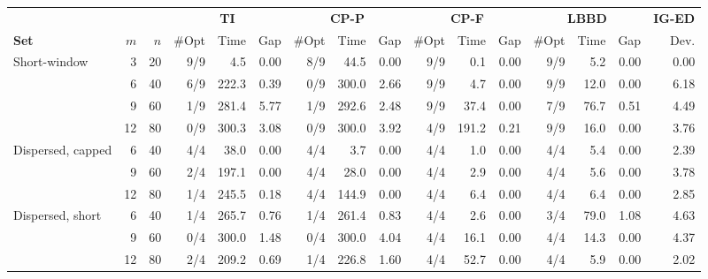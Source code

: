 \begin{tabular*}{\textwidth}{@{\extracolsep\fill}lrr rrr rrr rrr rrr r@{\extracolsep\fill}}
\toprule
& & & \multicolumn{3}{c}{\textbf{TI}} & \multicolumn{3}{c}{\textbf{CP-P}} & \multicolumn{3}{c}{\textbf{CP-F}} & \multicolumn{3}{c}{\textbf{LBBD}} & \textbf{IG-ED} \\
\cmidrule{4-6}\cmidrule{7-9}\cmidrule{10-12}\cmidrule{13-15}
\textbf{Set} & $m$ & $n$ & \#Opt & Time & Gap & \#Opt & Time & Gap & \#Opt & Time & Gap & \#Opt & Time & Gap & Dev. \\
\midrule
Short-window & 3 & 20 & 9/9 & 4.5 & 0.00 & 8/9 & 44.5 & 0.00 & 9/9 & 0.1 & 0.00 & 9/9 & 5.2 & 0.00 & 0.00 \\
 & 6 & 40 & 6/9 & 222.3 & 0.39 & 0/9 & 300.0 & 2.66 & 9/9 & 4.7 & 0.00 & 9/9 & 12.0 & 0.00 & 6.18 \\
 & 9 & 60 & 1/9 & 281.4 & 5.77 & 1/9 & 292.6 & 2.48 & 9/9 & 37.4 & 0.00 & 7/9 & 76.7 & 0.51 & 4.49 \\
 & 12 & 80 & 0/9 & 300.3 & 3.08 & 0/9 & 300.0 & 3.92 & 4/9 & 191.2 & 0.21 & 9/9 & 16.0 & 0.00 & 3.76 \\
\addlinespace
Dispersed, capped & 6 & 40 & 4/4 & 38.0 & 0.00 & 4/4 & 3.7 & 0.00 & 4/4 & 1.0 & 0.00 & 4/4 & 5.4 & 0.00 & 2.39 \\
 & 9 & 60 & 2/4 & 197.1 & 0.00 & 4/4 & 28.0 & 0.00 & 4/4 & 2.9 & 0.00 & 4/4 & 5.6 & 0.00 & 3.78 \\
 & 12 & 80 & 1/4 & 245.5 & 0.18 & 4/4 & 144.9 & 0.00 & 4/4 & 6.4 & 0.00 & 4/4 & 6.4 & 0.00 & 2.85 \\
\addlinespace
Dispersed, short & 6 & 40 & 1/4 & 265.7 & 0.76 & 1/4 & 261.4 & 0.83 & 4/4 & 2.6 & 0.00 & 3/4 & 79.0 & 1.08 & 4.63 \\
 & 9 & 60 & 0/4 & 300.0 & 1.48 & 0/4 & 300.0 & 4.04 & 4/4 & 16.1 & 0.00 & 4/4 & 14.3 & 0.00 & 4.37 \\
 & 12 & 80 & 2/4 & 209.2 & 0.69 & 1/4 & 226.8 & 1.60 & 4/4 & 52.7 & 0.00 & 4/4 & 5.9 & 0.00 & 2.02 \\
\bottomrule
\end{tabular*}
